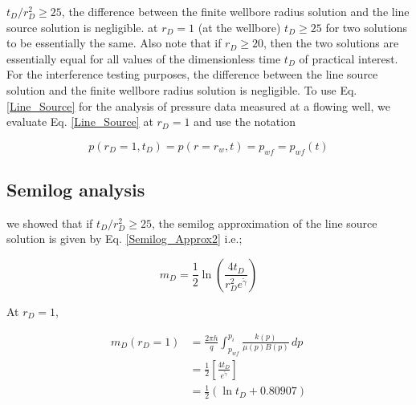 \documentclass{llncs}
\numberwithin{equation}{section}
\numberwithin{figure}{section}
\numberwithin{table}{section}
\begin{document}
     $t_{D}/r_{D}^{2}\geq25$, the difference between the finite wellbore radius solution and the line source solution is negligible.  at $r_{D}=1$ (at the wellbore)  $t_{D}\geq25$  for  two solutions to be essentially the same. Also note that if $r_{D}\geq20$, then the two solutions are essentially equal for all values of the dimensionless time $t_{D}$ of practical interest.\\
    
    For the interference testing purposes, the difference between the line source solution and the finite wellbore radius solution is negligible.
    To use Eq. \ref{Line_Source} for the analysis of pressure data measured at a flowing well, we evaluate Eq. \ref{Line_Source} at $r_{D}=1$ and use the notation
     
    \begin{equation}
           p\left( {{r}_{D}}=1,{{t}_{D}} \right)=p\left( r={{r}_{w}},t \right)={{p}_{wf}}={{p}_{wf}}\left( t \right)
        \label{Pwf}
    \end{equation}    
    
    \subsection{Semilog analysis}
   
     we showed that if $t_{D}/r_{D}^{2}\geq25$, the semilog approximation of the line source solution is given by Eq. \ref{Semilog_Approx2} i.e.;
    
    \begin{equation*}
        {{ m }_{D}}=\frac{1}{2}\ln \left( \frac{4{{t}_{D}}}{r_{D}^{2}{{e}^{\widetilde{\gamma }}}} \right)
    \end{equation*}
    
    At $r_{D}=1$, 
   
    \begin{equation}
        \begin{split}
     {{m}_{D}}\left( {{r}_{D}}=1 \right)&=\frac{2\pi h}{q}\int_{{{p}_{wf}}}^{{{p}_{i}}}{\frac{k\left( p \right)}{\mu \left( p \right)B\left( p \right)}}\,dp \\
    & =\frac{1}{2}\left[ \frac{4{{t}_{D}}}{{{e}^{\widetilde{\gamma }}}} \right] \\
    & =\frac{1}{2}\left( \ln {{t}_{D}}+0.80907 \right) \\
    \end{split}
        \label{mpwf_1}
    \end{equation}    
   
\end{document}
